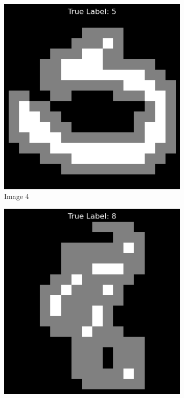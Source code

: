 \documentclass[final,3p,times,12pt]{article}
\begin{document}
\begin{figure}[H]
{\begin{minipage}{\linewidth}
            \vspace{0.3cm} %
            \begin{subfigure}[b]{0.3\linewidth}
                \centering
                \includegraphics[width=\linewidth]{images/image_4.png}
                \caption{Image 4}
                \label{fig:image4}
            \end{subfigure}
            \hfill
            \begin{subfigure}[b]{0.3\linewidth}
                \centering
                \includegraphics[width=\linewidth]{images/image_5.png}

\end{subfigure}
\end{minipage}}
\end{figure}
\end{document}
